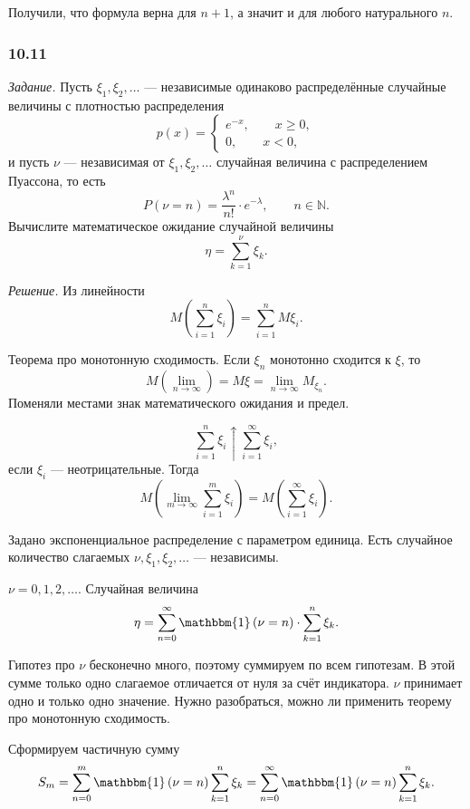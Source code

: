 Получили, что формула верна для $n+1$, а значит и для любого натурального $n$.

\subsubsection*{10.11}

\textit{Задание.} Пусть $ \xi_1, \xi_2, \dotsc $ --- независимые одинаково распределённые случайные величины с плотностью распределения
$$p \left( x \right) =
\begin{cases}
e^{-x}, \qquad x \geq 0, \\
0, \qquad x < 0,
\end{cases}$$
и пусть $ \nu $ --- независимая от $ \xi_1, \xi_2, \dotsc $ случайная величина с распределением Пуассона, то есть
$$P \left( \nu = n \right) =
\frac{ \lambda^n}{n!} \cdot e^{- \lambda }, \qquad n \in \mathbb{N}.$$
Вычислите математическое ожидание случайной величины
$$ \eta =
\sum \limits_{k=1}^{ \nu } \xi_k.$$

\textit{Решение.} Из линейности
$$M \left( \sum \limits_{i=1}^n \xi_i \right) =
\sum \limits_{i=1}^n M \xi_i.$$

Теорема про монотонную сходимость. Если $ \xi_n$ монотонно сходится к $ \xi $, то
$$M \left( \lim \limits_{n \to \infty } \right) =
M \xi =
\lim \limits_{n \to \infty } M_{ \xi_n}.$$
Поменяли местами знак математического ожидания и предел.

$$ \sum \limits_{i=1}^n \xi_i \uparrow \sum \limits_{i=1}^{ \infty } \xi_i,$$
если $ \xi_i$ --- неотрицательные.
Тогда
$$M \left( \lim \limits_{m \to \infty } \sum \limits_{i=1}^m \xi_i \right) =
M \left( \sum \limits_{i=1}^{ \infty } \xi_i \right).$$

Задано экспоненциальное распределение с параметром единица.
Есть случайное количество слагаемых $ \nu, \xi_1, \xi_2, \dotsc $ --- независимы.

$ \nu = 0, 1, 2, \dotsc $.
Случайная величина
$$ \eta =
\sum \limits_{n=0}^{ \infty } \mathbbm{1} \left( \nu = n \right) \cdot \sum \limits_{k=1}^n \xi_k.$$

Гипотез про $ \nu $ бесконечно много, поэтому суммируем по всем гипотезам.
В этой сумме только одно слагаемое отличается от нуля за счёт индикатора.
$ \nu $ принимает одно и только одно значение.
Нужно разобраться, можно ли применить теорему про монотонную сходимость.

Сформируем частичную сумму
$$S_m =
\sum \limits_{n=0}^m \mathbbm{1} \left( \nu = n \right) \sum \limits_{k=1}^n \xi_k =
\sum \limits_{n=0}^{ \infty } \mathbbm{1} \left( \nu = n \right) \sum \limits_{k=1}^n \xi_k.$$

